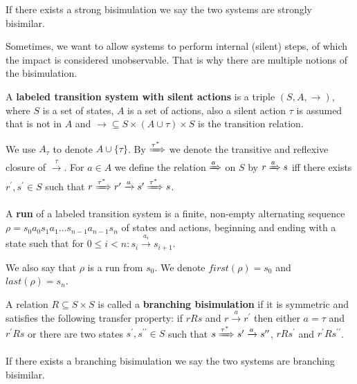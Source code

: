 If there exists a strong bisimulation we say the two systems are strongly bisimilar.

Sometimes, we want to allow systems to perform internal (silent) steps, of which the impact is considered unobservable. That is why there are multiple notions of the bisimulation.

\begin{definition}
  A  {\bf labeled transition system with silent actions} is a triple $(S, A, \rightarrow)$, where $S$ is a set of states, $A$ is a set of actions, also a silent action $\tau$ is assumed that is not in $A$ and $\rightarrow\subseteq S\times(A\cup\tau)\times S$ is the transition relation.
\end{definition}

We use $A_\tau$ to denote $A\cup\{\tau\}$.
By $\xRightarrow{\tau^*}$ we denote the transitive and reflexive closure of $\xrightarrow{\tau}$. For $a\in A$ we define the relation $\xRightarrow{a}$ on $S$ by $r\xRightarrow{a}s$ iff there exists $r^\prime, s^\prime\in S$ such that $r \xRightarrow{\tau^*} r^\prime \xrightarrow{a} s^\prime \xRightarrow{\tau^*} s$.

\begin{definition}
  A {\bf run} of a labeled transition system is a finite, non-empty alternating sequence $\rho = s_0a_0s_1a_1\ldots s_{n-1}a_{n-1}s_n$ of states and actions, beginning and ending with a state such that for $0\leq i<n: s_i\xrightarrow{a_i}s_{i+1}$.
\end{definition}

We also say that $\rho$ is a run from $s_0$. We denote $first(\rho)=s_0$ and $last(\rho)=s_n$.

\begin{definition}
  A relation $R\subseteq S\times S$ is called a  {\bf branching bisimulation} if it is symmetric and satisfies the following transfer property: if $rRs$ and $r\xrightarrow{a} r^\prime$ then either $a=\tau$ and $r^\prime Rs$ or there are two states $s^\prime,s^{\prime\prime}\in S$ such that $s \xRightarrow{\tau^*} s^\prime \xrightarrow{a} s^{\prime\prime}$, $rRs^\prime$ and $r^\prime Rs^{\prime\prime}$.
\end{definition}

If there exists a branching bisimulation we say the two systems are branching bisimilar.

